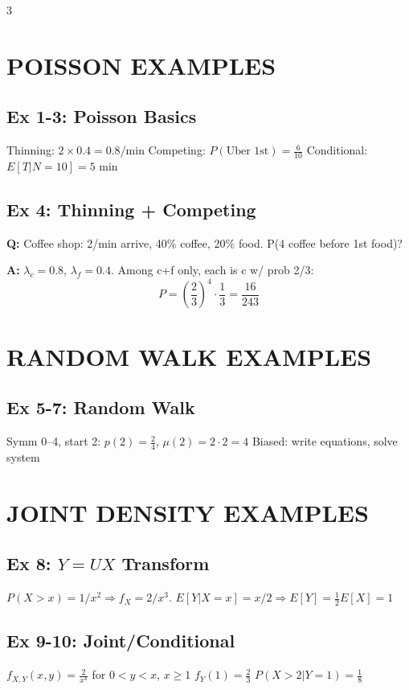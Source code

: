 \documentclass[7pt,landscape]{extarticle}
\begin{document}
\begin{multicols}{3}
\raggedcolumns

\section*{POISSON EXAMPLES}

\subsection*{Ex 1-3: Poisson Basics}
Thinning: $2 \times 0.4 = 0.8$/min \quad Competing: $P(\text{Uber 1st}) = \frac{6}{10}$ \quad Conditional: $E[T|N=10] = 5$ min

\subsection*{Ex 4: Thinning + Competing}
\textbf{Q:} Coffee shop: 2/min arrive, 40\% coffee, 20\% food. P(4 coffee before 1st food)?

\textbf{A:} $\lambda_c = 0.8$, $\lambda_f = 0.4$. Among c+f only, each is c w/ prob 2/3:
$$P = \left(\frac{2}{3}\right)^4 \cdot \frac{1}{3} = \frac{16}{243}$$

\section*{RANDOM WALK EXAMPLES}

\subsection*{Ex 5-7: Random Walk}
Symm 0--4, start 2: $p(2) = \frac{2}{4}$, $\mu(2) = 2 \cdot 2 = 4$ \quad Biased: write equations, solve system

\section*{JOINT DENSITY EXAMPLES}

\subsection*{Ex 8: $Y = UX$ Transform}
$P(X>x) = 1/x^2 \Rightarrow f_X = 2/x^3$. $E[Y|X=x] = x/2 \Rightarrow E[Y] = \frac{1}{2}E[X] = 1$

\subsection*{Ex 9-10: Joint/Conditional}
$f_{X,Y}(x,y) = \frac{2}{x^4}$ for $0<y<x$, $x \geq 1$ \quad $f_Y(1) = \frac{2}{3}$ \quad $P(X>2|Y=1) = \frac{1}{8}$


\end{multicols}
\end{document}
